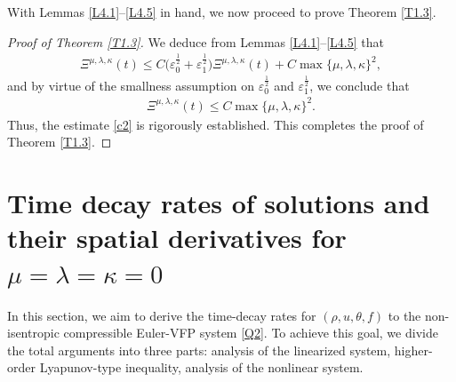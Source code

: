 \documentclass[reqno,11pt]{amsart}
\theoremstyle{plain}
\numberwithin{equation}{section}
\newcommand{\eps}{{\varepsilon}}
\begin{document}
With Lemmas \ref{L4.1}--\ref{L4.5} in hand, we now proceed to prove Theorem \ref{T1.3}.  
\begin{proof}[Proof of Theorem \ref{T1.3}]
We deduce from Lemmas \ref{L4.1}--\ref{L4.5} that  
\begin{align*}  
{\Xi} ^{\mu,\lambda,\kappa}(t) \leq C \big(\eps_0^\frac{1}{2} 
+ \eps_1^\frac{1}{2}\big){\Xi} ^{\mu,\lambda,\kappa}(t) + C\max\{\mu,\lambda,\kappa\}^2,  
\end{align*}  
and by virtue of the smallness assumption on $\eps_0^\frac{1}{2}$ and $\eps_1^\frac{1}{2}$, we conclude that  
\begin{align*}  
{\Xi} ^{\mu,\lambda,\kappa}(t) \leq C\max\{\mu,\lambda,\kappa\}^2.  
\end{align*}  
Thus, the estimate \eqref{c2} is rigorously established. This completes the proof of Theorem \ref{T1.3}.    
\end{proof}



\section{Time decay rates of solutions and their spatial derivatives for 
 {\(\mu=\lambda=\kappa=0\)} }


In this section, we aim to derive the time-decay rates for $(\rho, u, \theta, f)$ to the non-isentropic 
compressible Euler-VFP system \eqref{Q2}. To achieve this goal, we divide the total arguments into three parts:   analysis of 
the linearized system, higher-order Lyapunov-type inequality, analysis of the nonlinear system. 

\end{document}
